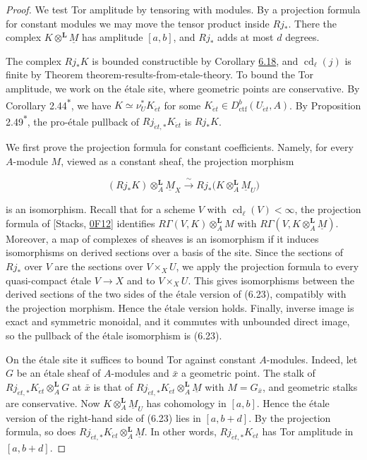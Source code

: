 \documentclass[11pt]{article}
\newcommand{\bpout}[1]{#1\textsuperscript{\hyperlink{bp-outside}{\ensuremath{\ast}}}}
\begin{document}
\begin{proof}[{Proof}]\label{bp59}%
We test Tor amplitude by tensoring with modules. By a projection formula for constant modules we may move the tensor product inside \(Rj_*\). There the complex \(K\otimes^{\mathbf L}\underline M\) has amplitude \([a,b]\), and \(Rj_*\) adds at most \(d\) degrees.

The complex \(Rj_*K\) is bounded constructible by Corollary \hyperref[bp54]{6.18}, and \(\operatorname{cd}_\ell(j)\) is finite by Theorem theorem-results-from-etale-theory. To bound the Tor amplitude, we work on the étale site, where geometric points are conservative. By Corollary \bpout{2.44}, we have \(K\simeq\nu_U^*K_{\acute{e}t}\) for some \(K_{\acute{e}t}\in D^b_{\mathrm{ctf}}(U_{\acute{e}t},A)\). By Proposition \bpout{2.49}, the pro-étale pullback of \(Rj_{\acute{e}t,*}K_{\acute{e}t}\) is \(Rj_*K\).

We first prove the projection formula for constant coefficients. Namely, for every \(A\)-module \(M\), viewed as a constant sheaf, the projection morphism

\[
(Rj_*K)\otimes_A^{\mathbf L}\underline M_X
\xrightarrow{\ \sim\ }
Rj_*\bigl(K\otimes_A^{\mathbf L}\underline M_U\bigr)
\tag{6.23}
\]

is an isomorphism. Recall that for a scheme \(V\) with \(\operatorname{cd}_\ell(V)<\infty\), the projection formula of [Stacks, \href{https://stacks.math.columbia.edu/tag/0F12}{0F12}] identifies \(R\Gamma(V,K)\otimes^{\mathbf L}_AM\) with \(R\Gamma(V,K\otimes^{\mathbf L}_A\underline M)\). Moreover, a map of complexes of sheaves is an isomorphism if it induces isomorphisms on derived sections over a basis of the site. Since the sections of \(Rj_*\) over \(V\) are the sections over \(V\times_XU\), we apply the projection formula to every quasi-compact étale \(V\to X\) and to \(V\times_XU\). This gives isomorphisms between the derived sections of the two sides of the étale version of (6.23), compatibly with the projection morphism. Hence the étale version holds. Finally, inverse image is exact and symmetric monoidal, and it commutes with unbounded direct image, so the pullback of the étale isomorphism is (6.23).

On the étale site it suffices to bound Tor against constant \(A\)-modules. Indeed, let \(G\) be an étale sheaf of \(A\)-modules and \(\bar x\) a geometric point. The stalk of \(Rj_{\acute{e}t,*}K_{\acute{e}t}\otimes^{\mathbf L}_AG\) at \(\bar x\) is that of \(Rj_{\acute{e}t,*}K_{\acute{e}t}\otimes^{\mathbf L}_A\underline M\) with \(M=G_{\bar x}\), and geometric stalks are conservative. Now \(K\otimes_A^{\mathbf L}\underline M_U\) has cohomology in \([a,b]\). Hence the étale version of the right-hand side of (6.23) lies in \([a,b+d]\). By the projection formula, so does \(Rj_{\acute{e}t,*}K_{\acute{e}t}\otimes^{\mathbf L}_A\underline M\). In other words, \(Rj_{\acute{e}t,*}K_{\acute{e}t}\) has Tor amplitude in \([a,b+d]\).


\end{proof}
\end{document}
